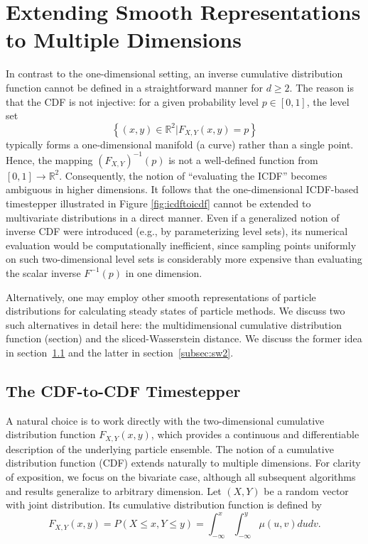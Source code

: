 \documentclass{article}
\begin{document}
\section{Extending Smooth Representations to Multiple Dimensions} \label{sec:higher_dimensions}
In contrast to the one-dimensional setting, an inverse cumulative distribution function cannot be defined in a straightforward manner for $d \ge 2$. The reason is that the CDF is not injective: for a given probability level $p \in [0,1]$, the level set
\begin{equation}
    \left\{(x,y) \in \mathbb{R}^2 | F_{X,Y}(x,y)=p\right\}
\end{equation}
typically forms a one-dimensional manifold (a curve) rather than a single point. Hence, the mapping $\left(F_{X,Y}\right)^{-1}(p)$ is not a well-defined function from $[0,1] \to \mathbb{R}^2$. Consequently, the notion of “evaluating the ICDF” becomes ambiguous in higher dimensions. It follows that the one-dimensional ICDF-based timestepper illustrated in Figure \ref{fig:icdftoicdf} cannot be extended to multivariate distributions in a direct manner. Even if a generalized notion of inverse CDF were introduced (e.g., by parameterizing level sets), its numerical evaluation would be computationally inefficient, since sampling points uniformly on such two-dimensional level sets is considerably more expensive than evaluating the scalar inverse $F^{-1}(p)$ in one dimension.

Alternatively, one may employ other smooth representations of particle distributions for calculating steady states of particle methods. We discuss two such alternatives in detail here: the multidimensional cumulative distribution function (section) and the sliced-Wasserstein distance. We discuss the former idea in section~\ref{subsec:cdf2d} and the latter in section~\ref{subsec:sw2}.

\subsection{The CDF-to-CDF Timestepper} \label{subsec:cdf2d}
A natural choice is to work directly with the two-dimensional cumulative distribution function $F_{X,Y}(x,y)$, which provides a continuous and differentiable description of the underlying particle ensemble. The notion of a cumulative distribution function (CDF) extends naturally to multiple dimensions. For clarity of exposition, we focus on the bivariate case, although all subsequent algorithms and results generalize to arbitrary dimension. Let $(X,Y)$ be a random vector with joint distribution. Its cumulative distribution function is defined by
\begin{equation}
 F_{X,Y}(x,y) = P(X\leq x, Y\leq y) = \int_{-\infty}^x \int_{-\infty}^y \mu(u,v) dudv.
\end{equation}
\end{document}
